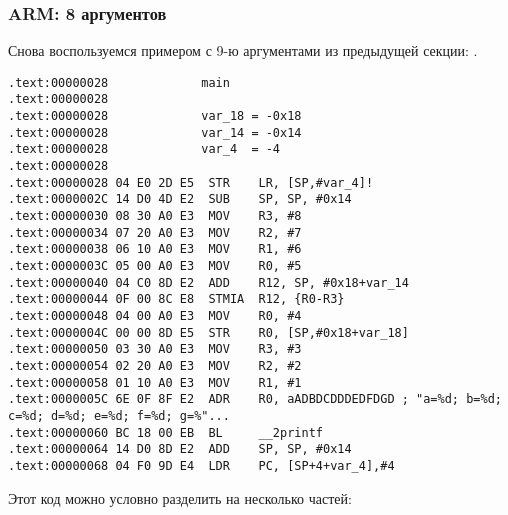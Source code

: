 \subsubsection{ARM: 8 аргументов}

Снова воспользуемся примером с 9-ю аргументами из предыдущей секции: .



\myparagraph{\OptimizingKeilVI: \ARMMode}

\begin{lstlisting}
.text:00000028             main
.text:00000028
.text:00000028             var_18 = -0x18
.text:00000028             var_14 = -0x14
.text:00000028             var_4  = -4
.text:00000028
.text:00000028 04 E0 2D E5  STR    LR, [SP,#var_4]!
.text:0000002C 14 D0 4D E2  SUB    SP, SP, #0x14
.text:00000030 08 30 A0 E3  MOV    R3, #8
.text:00000034 07 20 A0 E3  MOV    R2, #7
.text:00000038 06 10 A0 E3  MOV    R1, #6
.text:0000003C 05 00 A0 E3  MOV    R0, #5
.text:00000040 04 C0 8D E2  ADD    R12, SP, #0x18+var_14
.text:00000044 0F 00 8C E8  STMIA  R12, {R0-R3}
.text:00000048 04 00 A0 E3  MOV    R0, #4
.text:0000004C 00 00 8D E5  STR    R0, [SP,#0x18+var_18]
.text:00000050 03 30 A0 E3  MOV    R3, #3
.text:00000054 02 20 A0 E3  MOV    R2, #2
.text:00000058 01 10 A0 E3  MOV    R1, #1
.text:0000005C 6E 0F 8F E2  ADR    R0, aADBDCDDDEDFDGD ; "a=%d; b=%d; c=%d; d=%d; e=%d; f=%d; g=%"...
.text:00000060 BC 18 00 EB  BL     __2printf
.text:00000064 14 D0 8D E2  ADD    SP, SP, #0x14
.text:00000068 04 F0 9D E4  LDR    PC, [SP+4+var_4],#4
\end{lstlisting}

Этот код можно условно разделить на несколько частей:

